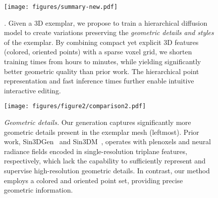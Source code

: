 \begin{figure}[!ht] 
    \centering
     \texttt{[image: figures/summary-new.pdf]}\vspace*{-1mm}
    \caption{\emph{\ourmethod.} Given a 3D exemplar, we propose to train a hierarchical diffusion model to create variations preserving the \emph{geometric details and styles} of the exemplar. By combining compact yet explicit 3D features (colored, oriented points) with a sparse voxel grid, we shorten training times from hours to minutes, while yielding significantly better geometric quality than prior work. The hierarchical point representation and fast inference times further enable intuitive interactive editing.\vspace*{-5mm}}
    \label{fig:enter-label}
\end{figure}

\begin{figure*}[t]
    \centering
      \texttt{[image: figures/figure2/comparison2.pdf]}\vspace*{-5mm}
      \subfloat[Ours]{\hspace{.25\linewidth}}
              \subfloat[Sin3DM]{\hspace{.25\linewidth}}
    \vspace*{-2.5mm}
    \caption{\emph{Geometric details.} Our generation captures significantly more geometric details present in the exemplar mesh (leftmost). Prior work, Sin3DGen~\cite{li2023patch} and Sin3DM~\cite{wu2024sindm}, operates with plenoxels and neural radiance fields encoded in single-resolution triplane features, respectively, which lack the capability to sufficiently represent and supervise high-resolution geometric details. In contrast, our method employs a colored and oriented point set, providing precise geometric information.\vspace*{-3mm}}
    \label{fig:results}
\end{figure*}

